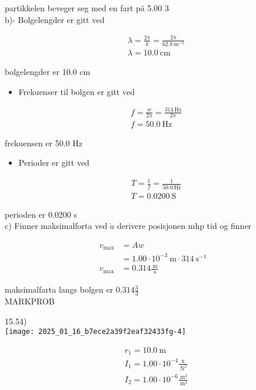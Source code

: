 \documentclass[10pt]{article}
\begin{document}
partikkelen beveger seg med en fart pä 5.00 3\\
b)- Bolgelengder er gitt ved

$$
\begin{aligned}
& \lambda=\frac{2 \pi}{k}=\frac{2 \pi}{62.8 \mathrm{~m}^{-1}} \\
& \lambda=10.0 \mathrm{~cm}
\end{aligned}
$$

bolgelengder er 10.0 cm

\begin{itemize}
  \item Frekuenser til bolgen er gitt ved
\end{itemize}

$$
\begin{aligned}
& f=\frac{w}{2 \pi}=\frac{314 \mathrm{~Hz}}{2 \pi} \\
& f=50.0 \mathrm{~Hz}
\end{aligned}
$$

frekuensen er 50.0 Hz

\begin{itemize}
  \item Perioder er gitt ved
\end{itemize}

$$
\begin{aligned}
& T=\frac{1}{f}=\frac{1}{50.0 \mathrm{~Hz}} \\
& T=0.0200 \mathrm{~S}
\end{aligned}
$$

perioden er 0.0200 s\\
c) Finner maksimalforta ved $\dot{a}$ derivere posisjonen mhp tid og finner

$$
\begin{aligned}
v_{\max } & =A w \\
& =1.00 \cdot 10^{-3} \mathrm{~m} \cdot 314 \mathrm{~s}^{-1} \\
v_{\max } & =0.314 \frac{\mathrm{~m}}{\mathrm{~s}}
\end{aligned}
$$

maksimalfarta langs bolgen er $0.314 \frac{\mathrm{3}}{3}$\\

MARKPROB

15.54)\\
\texttt{[image: 2025\_01\_16\_b7ece2a39f2eaf32433fg-4]}

$$
\begin{aligned}
& r_{1}=10.0 \mathrm{~m} \\
& I_{1}=1.00 \cdot 10^{-4} \frac{\mathrm{x}}{\mathrm{~N}^{2}} \\
& I_{2}=1.00 \cdot 10^{-6} \frac{\mathrm{~m}^{2}}{\mathrm{~m}^{2}}
\end{aligned}
$$
\end{document}
